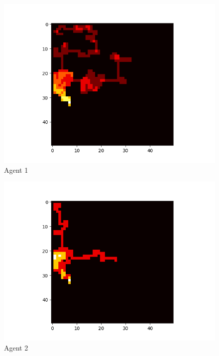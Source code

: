 \begin{figure}[!ht]
	\centering
	\includegraphics[scale=0.70]{images/test2_agent1.png}
	\caption{Agent 1}
	\label{fig:test2Agent1}
\end{figure}

\begin{figure}[!ht]
	\centering
	\includegraphics[scale=0.70]{images/test2_agent2.png}
	\caption{Agent 2}
	\label{fig:test2Agent2}
\end{figure}

